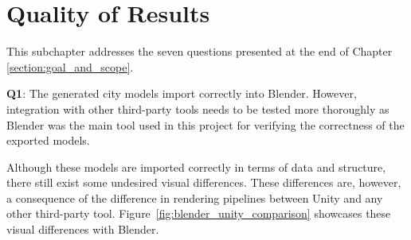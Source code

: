 \section{Quality of Results}

This subchapter addresses the seven questions presented at the end of Chapter \ref{section:goal_and_scope}.

\textbf{Q1}:
The generated city models import correctly into Blender.
However, integration with other third-party tools needs to be tested more thoroughly as Blender was the main tool used in this project for verifying the correctness of the exported models.

Although these models are imported correctly in terms of data and structure, there still exist some undesired visual differences.
These differences are, however, a consequence of the difference in rendering pipelines between Unity and any other third-party tool.
Figure~\ref{fig:blender_unity_comparison} showcases these visual differences with Blender.

